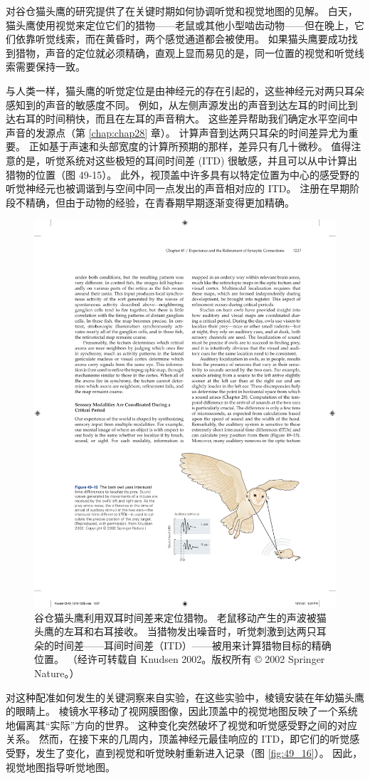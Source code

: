 对谷仓猫头鹰的研究提供了在关键时期如何协调听觉和视觉地图的见解。 白天，猫头鹰使用视觉来定位它们的猎物——老鼠或其他小型啮齿动物——但在晚上，它们依靠听觉线索，而在黄昏时，两个感觉通道都会被使用。 如果猫头鹰要成功找到猎物，声音的定位就必须精确，直观上显而易见的是，同一位置的视觉和听觉线索需要保持一致。

与人类一样，猫头鹰的听觉定位是由神经元的存在引起的，这些神经元对两只耳朵感知到的声音的敏感度不同。 例如，从左侧声源发出的声音到达左耳的时间比到达右耳的时间稍快，而且在左耳的声音稍大。 这些差异帮助我们确定水平空间中声音的发源点（第 \ref{chap:chap28} 章）。 计算声音到达两只耳朵的时间差异尤为重要。 
正如基于声速和头部宽度的计算所预期的那样，差异只有几十微秒。 值得注意的是，听觉系统对这些极短的耳间时间差 (ITD) 很敏感，并且可以从中计算出猎物的位置（图 49-15）。 
此外，视顶盖中许多具有以特定位置为中心的感受野的听觉神经元也被调谐到与空间中同一点发出的声音相对应的 ITD。 注册在早期阶段不精确，但由于动物的经验，在青春期早期逐渐变得更加精确。

\begin{figure}[htbp]
	\centering
	\includegraphics[width=0.6\linewidth]{chap49/fig_49_15}
	\caption{谷仓猫头鹰利用双耳时间差来定位猎物。 老鼠移动产生的声波被猫头鹰的左耳和右耳接收。 当猎物发出噪音时，听觉刺激到达两只耳朵的时间差——耳间时间差（ITD）——被用来计算猎物目标的精确位置。 （经许可转载自 Knudsen 2002。版权所有 © 2002 Springer Nature。）}
	\label{fig:49_15}
\end{figure}

对这种配准如何发生的关键洞察来自实验，在这些实验中，棱镜安装在年幼猫头鹰的眼睛上。 棱镜水平移动了视网膜图像，因此顶盖中的视觉地图反映了一个系统地偏离其“实际”方向的世界。 这种变化突然破坏了视觉和听觉感受野之间的对应关系。 
然而，在接下来的几周内，顶盖神经元最佳响应的 ITD，即它们的听觉感受野，发生了变化，直到视觉和听觉映射重新进入记录（图 \ref{fig:49_16}）。 
因此，视觉地图指导听觉地图。

